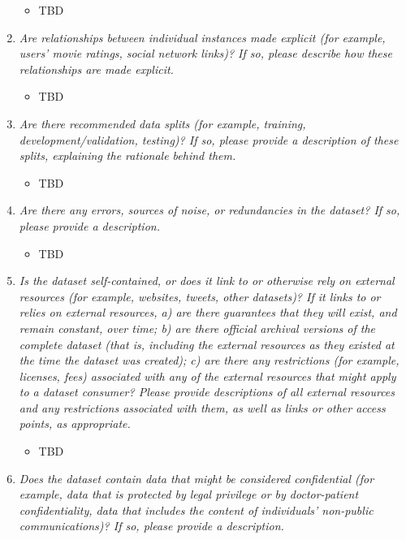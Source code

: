 \documentclass[
  letterpaper,
  DIV=11,
  numbers=noendperiod]{scrartcl}
\providecommand{\tightlist}{%
  \setlength{\itemsep}{0pt}\setlength{\parskip}{0pt}}\usepackage{longtable,booktabs,array}
\begin{document}
\begin{enumerate}
  \begin{itemize}
  \tightlist
  \item
    TBD
  \end{itemize}
\item
  \emph{Are relationships between individual instances made explicit
  (for example, users' movie ratings, social network links)? If so,
  please describe how these relationships are made explicit.}

  \begin{itemize}
  \tightlist
  \item
    TBD
  \end{itemize}
\item
  \emph{Are there recommended data splits (for example, training,
  development/validation, testing)? If so, please provide a description
  of these splits, explaining the rationale behind them.}

  \begin{itemize}
  \tightlist
  \item
    TBD
  \end{itemize}
\item
  \emph{Are there any errors, sources of noise, or redundancies in the
  dataset? If so, please provide a description.}

  \begin{itemize}
  \tightlist
  \item
    TBD
  \end{itemize}
\item
  \emph{Is the dataset self-contained, or does it link to or otherwise
  rely on external resources (for example, websites, tweets, other
  datasets)? If it links to or relies on external resources, a) are
  there guarantees that they will exist, and remain constant, over time;
  b) are there official archival versions of the complete dataset (that
  is, including the external resources as they existed at the time the
  dataset was created); c) are there any restrictions (for example,
  licenses, fees) associated with any of the external resources that
  might apply to a dataset consumer? Please provide descriptions of all
  external resources and any restrictions associated with them, as well
  as links or other access points, as appropriate.}

  \begin{itemize}
  \tightlist
  \item
    TBD
  \end{itemize}
\item
  \emph{Does the dataset contain data that might be considered
  confidential (for example, data that is protected by legal privilege
  or by doctor-patient confidentiality, data that includes the content
  of individuals' non-public communications)? If so, please provide a
  description.}


\end{enumerate}
\end{document}
